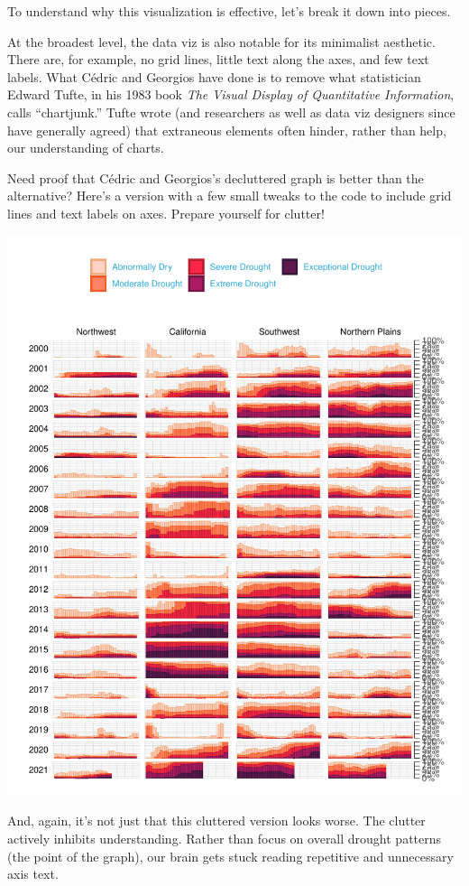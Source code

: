 \documentclass[
]{book}
\begin{document}
To understand why this visualization is effective, let's break it down into pieces.

At the broadest level, the data viz is also notable for its minimalist aesthetic. There are, for example, no grid lines, little text along the axes, and few text labels. What Cédric and Georgios have done is to remove what statistician Edward Tufte, in his 1983 book \emph{The Visual Display of Quantitative Information}, calls ``chartjunk.'' Tufte wrote (and researchers as well as data viz designers since have generally agreed) that extraneous elements often hinder, rather than help, our understanding of charts.

Need proof that Cédric and Georgios's decluttered graph is better than the alternative? Here's a version with a few small tweaks to the code to include grid lines and text labels on axes. Prepare yourself for clutter!

\includegraphics[width=1\linewidth]{data-viz_files/figure-latex/unnamed-chunk-4-1}

And, again, it's not just that this cluttered version looks worse. The clutter actively inhibits understanding. Rather than focus on overall drought patterns (the point of the graph), our brain gets stuck reading repetitive and unnecessary axis text.
\end{document}
